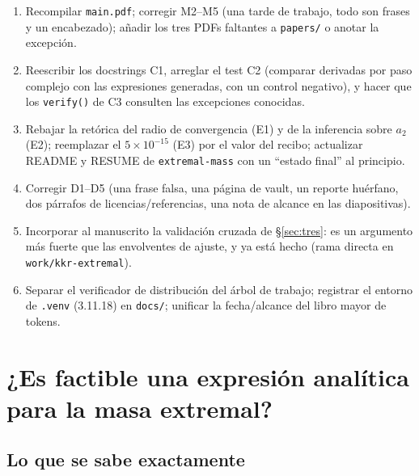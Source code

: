 \documentclass[10pt,a4paper]{article}
\newcommand{\code}[1]{\texttt{#1}}
\begin{document}
\begin{enumerate}[nosep]
\item Recompilar \code{main.pdf}; corregir M2--M5 (una tarde de trabajo, todo son frases y un
 encabezado); añadir los tres PDFs faltantes a \code{papers/} o anotar la excepción.
\item Reescribir los docstrings C1, arreglar el test C2 (comparar derivadas por paso complejo con
 las expresiones generadas, con un control negativo), y hacer que los \code{verify()} de C3 consulten
 las excepciones conocidas.
\item Rebajar la retórica del radio de convergencia (E1) y de la inferencia sobre $a_2$ (E2);
 reemplazar el $5\times10^{-15}$ (E3) por el valor del recibo; actualizar README y RESUME de
 \code{extremal-mass} con un ``estado final'' al principio.
\item Corregir D1--D5 (una frase falsa, una página de vault, un reporte huérfano, dos párrafos de
 licencias/referencias, una nota de alcance en las diapositivas).
\item Incorporar al manuscrito la validación cruzada de \S\ref{sec:tres}: es un argumento más fuerte
 que las envolventes de ajuste, y ya está hecho (rama directa en \code{work/kkr-extremal}).
\item Separar el verificador de distribución del árbol de trabajo; registrar el entorno de
 \code{.venv} (3.11.18) en \code{docs/}; unificar la fecha/alcance del libro mayor de tokens.
\end{enumerate}

\section{¿Es factible una expresión analítica para la masa extremal?}
\label{sec:analitica}

\subsection{Lo que se sabe exactamente}
\end{document}
